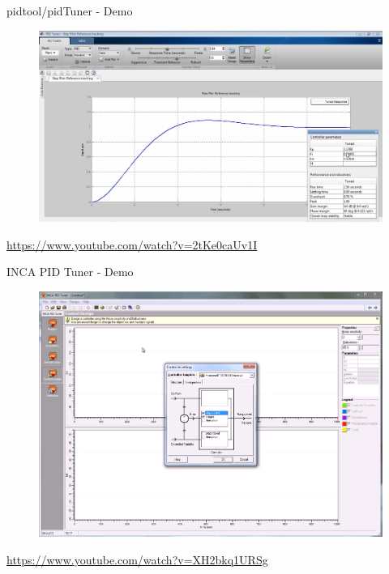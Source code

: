 \begin{frame}{pidtool/pidTuner - Demo}
	\begin{figure}
		\centering
		\includegraphics[width=0.7\linewidth]{img/pid_tool}
	\end{figure}
	\url{https://www.youtube.com/watch?v=2tKe0caUv1I}
\end{frame}

\begin{frame}{INCA PID Tuner - Demo}
	\begin{figure}
		\centering
		\includegraphics[width=0.7\linewidth]{img/inca_tunner}
	\end{figure}
	\url{https://www.youtube.com/watch?v=XH2bkq1URSg}
\end{frame}